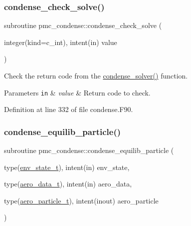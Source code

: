\subsubsection{\texorpdfstring{condense\+\_\+check\+\_\+solve()}{condense\_check\_solve()}}
{\footnotesize\ttfamily subroutine pmc\+\_\+condense\+::condense\+\_\+check\+\_\+solve (\begin{DoxyParamCaption}\item[{integer(kind=c\+\_\+int), intent(in)}]{value }\end{DoxyParamCaption})}



Check the return code from the \mbox{\hyperlink{condense__solver_8c_a2b18e4f55610de6bcaf2a7eb954cf7aa}{condense\+\_\+solver()}} function. 


\begin{DoxyParams}[1]{Parameters}
\mbox{\tt in}  & {\em value} & Return code to check. \\
\hline
\end{DoxyParams}


Definition at line 332 of file condense.\+F90.

\mbox{\label{namespacepmc__condense_a9439c40ef474d3165689e6c7989ae652}} 
\subsubsection{\texorpdfstring{condense\+\_\+equilib\+\_\+particle()}{condense\_equilib\_particle()}}
{\footnotesize\ttfamily subroutine pmc\+\_\+condense\+::condense\+\_\+equilib\+\_\+particle (\begin{DoxyParamCaption}\item[{type(\mbox{\hyperlink{structpmc__env__state_1_1env__state__t}{env\+\_\+state\+\_\+t}}), intent(in)}]{env\+\_\+state,  }\item[{type(\mbox{\hyperlink{structpmc__aero__data_1_1aero__data__t}{aero\+\_\+data\+\_\+t}}), intent(in)}]{aero\+\_\+data,  }\item[{type(\mbox{\hyperlink{structpmc__aero__particle_1_1aero__particle__t}{aero\+\_\+particle\+\_\+t}}), intent(inout)}]{aero\+\_\+particle }\end{DoxyParamCaption})}



